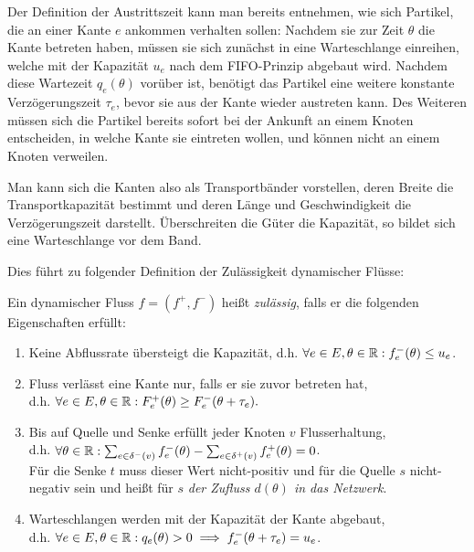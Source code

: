 Der Definition der Austrittszeit kann man bereits entnehmen, wie sich Partikel, die an einer Kante $e$ ankommen verhalten  sollen:
Nachdem sie zur Zeit $\theta$ die Kante betreten haben, müssen sie sich zunächst in eine Warteschlange einreihen, welche mit der Kapazität $u_e$ nach dem FIFO-Prinzip abgebaut wird.
Nachdem diese Wartezeit $q_e(\theta)$ vorüber ist, benötigt das Partikel eine weitere konstante Verzögerungszeit $\tau_e$, bevor sie aus der Kante wieder austreten kann.
Des Weiteren müssen sich die Partikel bereits sofort bei der Ankunft an einem Knoten entscheiden, in welche Kante sie eintreten wollen, und können nicht an einem Knoten verweilen.

Man kann sich die Kanten also als Transportbänder vorstellen, deren Breite die Transportkapazität bestimmt und deren Länge und Geschwindigkeit die Verzögerungszeit darstellt.
Überschreiten die Güter die Kapazität, so bildet sich eine Warteschlange vor dem Band.

Dies führt zu folgender Definition der Zulässigkeit dynamischer Flüsse:

\begin{definition}
	Ein dynamischer Fluss $f=(f^+, f^-)$ heißt \emph{zulässig}, falls er die folgenden Eigenschaften erfüllt:
	\begin{enumerate}[label=(F\arabic*)]
		\item\label{def-feasible-flow-capacity} Keine Abflussrate übersteigt die Kapazität, d.h. $\forall e\in E, \theta\in\mathbb{R}: f_e^-(\theta)\leq u_e$.
		\item\label{def-feasible-flow-no-negative-flow} Fluss verlässt eine Kante nur, falls er sie zuvor betreten hat,\\ d.h. $\forall e\in E, \theta\in\mathbb{R}: F_e^+(\theta) \geq F_e^-(\theta + \tau_e).$
		\item\label{def-feasible-flow-no-flow-at-node} Bis auf Quelle und Senke erfüllt jeder Knoten $v$ Flusserhaltung,\\
		d.h. $\forall\theta\in\mathbb{R}: \sum_{e\in\delta^-(v)}f^-_e(\theta) - \sum_{e\in\delta^+(v)} f_e^+(\theta) = 0$.\\
		Für die Senke $t$ muss dieser Wert nicht-positiv und für die Quelle $s$ nicht-negativ sein und heißt für $s$ \emph{der Zufluss $d(\theta)$ in das Netzwerk}.
		\item\label{def-feasible-flow-queue-with-capacity} Warteschlangen werden mit der Kapazität der Kante abgebaut,\\ d.h. $\forall e\in E, \theta\in\mathbb{R}: q_e(\theta) > 0 \implies f_e^-(\theta + \tau_e) = u_e$.
	\end{enumerate}
\end{definition}

